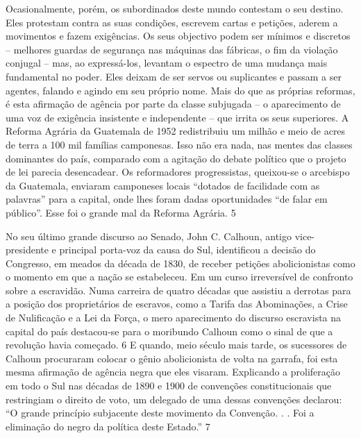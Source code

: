  
\par
 
Ocasionalmente, porém, os subordinados deste mundo contestam o seu destino. Eles protestam contra as suas condições, escrevem cartas e petições, aderem a movimentos e fazem exigências. Os seus objectivo podem ser mínimos e discretos – melhores guardas de segurança nas máquinas das fábricas, o fim da violação conjugal – mas, ao expressá-los, levantam o espectro de uma mudança mais fundamental no poder. Eles deixam de ser servos ou suplicantes e passam a ser agentes, falando e agindo em seu próprio nome. Mais do que as próprias reformas, é esta afirmação de agência por parte da classe subjugada – o aparecimento de uma voz de exigência insistente e independente – que irrita os seus superiores. A Reforma Agrária da Guatemala de 1952 redistribuiu um milhão e meio de acres de terra a 100 mil famílias camponesas. Isso não era nada, nas mentes das classes dominantes do país, comparado com a agitação do debate político que o projeto de lei parecia desencadear. Os reformadores progressistas, queixou-se o arcebispo da Guatemala, enviaram camponeses locais “dotados de facilidade com as palavras” para a capital, onde lhes foram dadas oportunidades “de falar em público”. Esse foi o grande mal da Reforma Agrária.
 {\color{blue} 5}  

 
\par
 
No seu último grande discurso ao Senado, John C. Calhoun, antigo vice-presidente e principal porta-voz da causa do Sul, identificou a decisão do Congresso, em meados da década de 1830, de receber petições abolicionistas como o momento em que a nação se estabeleceu. Em um curso irreversível de confronto sobre a escravidão. Numa carreira de quatro décadas que assistiu a derrotas para a posição dos proprietários de escravos, como a Tarifa das Abominações, a Crise de Nulificação e a Lei da Força, o mero aparecimento do discurso escravista na capital do país destacou-se para o moribundo Calhoun como o sinal de que a revolução havia começado.
 {\color{blue} 6}  
E quando, meio século mais tarde, os sucessores de Calhoun procuraram colocar o gênio abolicionista de volta na garrafa, foi esta mesma afirmação de agência negra que eles visaram. Explicando a proliferação em todo o Sul nas décadas de 1890 e 1900 de convenções constitucionais que restringiam o direito de voto, um delegado de uma dessas convenções declarou: “O grande princípio subjacente deste movimento da Convenção. . . Foi a eliminação do negro da política deste Estado.”
 {\color{blue} 7}  

